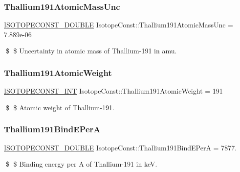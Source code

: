 \subsubsection{\texorpdfstring{Thallium191\+Atomic\+Mass\+Unc}{Thallium191AtomicMassUnc}}
{\footnotesize\ttfamily \mbox{\hyperlink{group___isotope_const-_macros_ga8f45a7272ce02c0b4c65c44636ed719a}{I\+S\+O\+T\+O\+P\+E\+C\+O\+N\+S\+T\+\_\+\+D\+O\+U\+B\+LE}} Isotope\+Const\+::\+Thallium191\+Atomic\+Mass\+Unc = 7.\+889e-\/06}

\$ \$ Uncertainty in atomic mass of Thallium-\/191 in amu. \mbox{\label{group___isotope_const-_thallium-_tl191_gab2735a9acf727875edb1574ad5c48b29}} 
\subsubsection{\texorpdfstring{Thallium191\+Atomic\+Weight}{Thallium191AtomicWeight}}
{\footnotesize\ttfamily \mbox{\hyperlink{group___isotope_const-_macros_ga5f18360b3e99483a35c32d789e62621c}{I\+S\+O\+T\+O\+P\+E\+C\+O\+N\+S\+T\+\_\+\+I\+NT}} Isotope\+Const\+::\+Thallium191\+Atomic\+Weight = 191}

\$ \$ Atomic weight of Thallium-\/191. \mbox{\label{group___isotope_const-_thallium-_tl191_ga3eabe23e326b9753e7186d356db72b29}} 
\subsubsection{\texorpdfstring{Thallium191\+Bind\+E\+PerA}{Thallium191BindEPerA}}
{\footnotesize\ttfamily \mbox{\hyperlink{group___isotope_const-_macros_ga8f45a7272ce02c0b4c65c44636ed719a}{I\+S\+O\+T\+O\+P\+E\+C\+O\+N\+S\+T\+\_\+\+D\+O\+U\+B\+LE}} Isotope\+Const\+::\+Thallium191\+Bind\+E\+PerA = 7877.}

\$ \$ Binding energy per A of Thallium-\/191 in keV. \mbox{\label{group___isotope_const-_thallium-_tl191_ga6518e70458ab2c04b8dd9eb2cb43a709}} 
